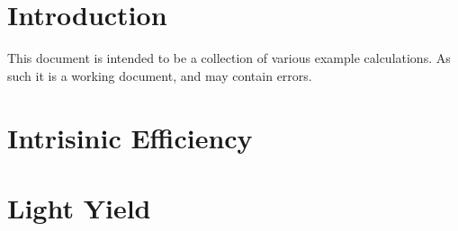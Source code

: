 \documentclass{article}
\begin{document}
\printnomenclature
\printindex
\section{Introduction}
This document is intended to be a collection of various example calculations.
As such it is a working document, and may contain errors.

\section{Intrisinic Efficiency}

\section{Light Yield}

\end{document}
